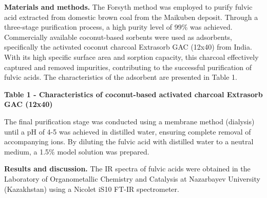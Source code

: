 \begin{multicols}{2}
{\bfseries Materials and methods.} The Forsyth method was employed to
purify fulvic acid extracted from domestic brown coal from the Maikuben
deposit. Through a three-stage purification process, a high purity level
of 99\% was achieved. Commercially available coconut-based sorbents were
used as adsorbents, specifically the activated coconut charcoal
Extrasorb GAC (12x40) from India. With its high specific surface area
and sorption capacity, this charcoal effectively captured and removed
impurities, contributing to the successful purification of fulvic acids.
The characteristics of the adsorbent are presented in Table 1.
\end{multicols}

{\bfseries Table 1 - Characteristics of coconut-based activated charcoal Extrasorb GAC (12x40)}


\begin{multicols}{2}
The final purification stage was conducted using a membrane method
(dialysis) until a pH of 4-5 was achieved in distilled water, ensuring
complete removal of accompanying ions. By diluting the fulvic acid with
distilled water to a neutral medium, a 1.5\% model solution was
prepared.

{\bfseries Results and discussion.} The IR spectra of fulvic acids were
obtained in the Laboratory of Organometallic Chemistry and Catalysis at
Nazarbayev University (Kazakhstan) using a Nicolet iS10 FT-IR
spectrometer.


\end{multicols}
